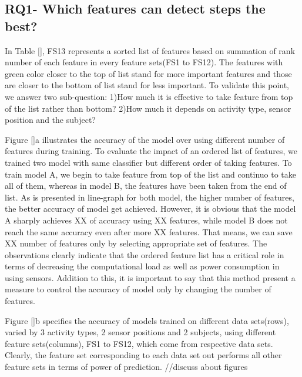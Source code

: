 \subsection{RQ1- Which features can detect steps the best?}
In Table [], FS13 represents a sorted list of features based on summation of rank number of each feature in every feature sets(FS1 to FS12). The features with green color closer to the top of list stand for more important features and those are closer to the bottom of list stand for less important. To validate this point, we answer two sub-question: 1)How much it is effective to take feature from top of the list rather than bottom? 2)How much it depends on activity type, sensor position and the subject?

Figure []a illustrates the accuracy of the model over using different number of features during training. To evaluate the impact of an ordered list of features, we trained two model with same classifier but different order of taking features. To train model A, we begin to take feature from top of the list and continuo to take all of them, whereas in model B, the features have been taken from the end of list. As is presented in line-graph for both model, the higher number of features, the better accuracy of model get achieved. However, it is obvious that the model A sharply achieves XX of accuracy using XX features, while model B does not reach the same accuracy even after more XX features. That means, we can save XX number of features only by selecting appropriate set of features. The observations clearly indicate that the ordered feature list has a critical role in terms of decreasing the computational load as well as power consumption in using sensors. Addition to this, it is important to say that this method present a measure to control the accuracy of model only by changing the number of features.

Figure []b specifies the accuracy of models trained on different data sets(rows), varied by 3 activity types, 2 sensor positions and 2 subjects, using different feature sets(columns), FS1 to FS12, which come from respective data sets. Clearly, the feature set corresponding to each data set out performs all other feature sets in terms of power of prediction.
//discuss about figures 

